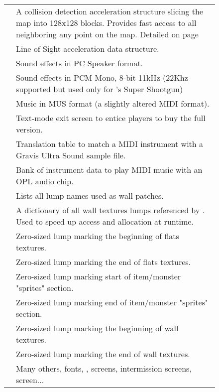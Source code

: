 \begin{figure}[H]
\begin{tabularx}{\textwidth}{ L{0.2}  L{0.8}}
   & A collision detection acceleration structure slicing the map into 128x128 blocks. Provides fast access to all  neighboring any point on the map. Detailed on page \pageref{blockmapdetails} \\
   &  Line of Sight acceleration data structure.\\
  \toprule
   &  Sound effects in PC Speaker format.\\
   &  Sound effects in PCM Mono, 8-bit 11kHz (22Khz supported but used only for \doomii{}'s Super Shootgun)\\
   & Music in MUS format (a slightly altered MIDI format).\\
  \toprule
   & Text-mode exit screen to entice players to buy the full version. \\
   & Translation table to match a MIDI instrument with a Gravis Ultra Sound sample file.\\
   &  Bank of instrument data to play MIDI music with an OPL audio chip.\\
   &  Lists all lump names used as wall patches.\\
   &  A dictionary of all wall textures lumps referenced by . Used to speed up access and allocation at runtime.\\  
   &  Zero-sized lump marking the beginning of flats textures.\\  
   &   Zero-sized lump marking the end of flats textures.\\  
   & Zero-sized lump marking start of item/monster "sprites" section. \\  
   & Zero-sized lump marking end of item/monster "sprites" section. \\  
   & Zero-sized lump marking the beginning of wall textures.\\
   & Zero-sized lump marking the end of wall textures.\\
   &  Many others, fonts, ,  screens, intermission screens,  screen... \\  
   \toprule
\end{tabularx}
\end{figure}
\par
\pagebreak






